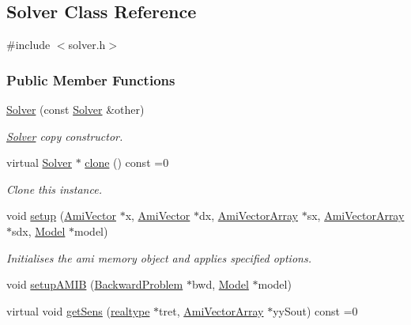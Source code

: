 \hypertarget{classamici_1_1_solver}{}\subsection{Solver Class Reference}
\label{classamici_1_1_solver}


{\ttfamily \#include $<$solver.\+h$>$}

\subsubsection*{Public Member Functions}
\begin{DoxyCompactItemize}
\item 
\mbox{\hyperlink{classamici_1_1_solver_a4676b699f5efede8bee51636bbe8b54a}{Solver}} (const \mbox{\hyperlink{classamici_1_1_solver}{Solver}} \&other)
\begin{DoxyCompactList}\small\item\em \mbox{\hyperlink{classamici_1_1_solver}{Solver}} copy constructor. \end{DoxyCompactList}\item 
virtual \mbox{\hyperlink{classamici_1_1_solver}{Solver}} $\ast$ \mbox{\hyperlink{classamici_1_1_solver_ad40c0e06f5ee35afc1dd60e9f80ac5be}{clone}} () const =0
\begin{DoxyCompactList}\small\item\em Clone this instance. \end{DoxyCompactList}\item 
void \mbox{\hyperlink{classamici_1_1_solver_a5cffde567803181ec12c71117c74b47a}{setup}} (\mbox{\hyperlink{classamici_1_1_ami_vector}{Ami\+Vector}} $\ast$x, \mbox{\hyperlink{classamici_1_1_ami_vector}{Ami\+Vector}} $\ast$dx, \mbox{\hyperlink{classamici_1_1_ami_vector_array}{Ami\+Vector\+Array}} $\ast$sx, \mbox{\hyperlink{classamici_1_1_ami_vector_array}{Ami\+Vector\+Array}} $\ast$sdx, \mbox{\hyperlink{classamici_1_1_model}{Model}} $\ast$model)
\begin{DoxyCompactList}\small\item\em Initialises the ami memory object and applies specified options. \end{DoxyCompactList}\item 
void \mbox{\hyperlink{classamici_1_1_solver_a04ef010145a9a17746128e55d4e0a436}{setup\+A\+M\+IB}} (\mbox{\hyperlink{classamici_1_1_backward_problem}{Backward\+Problem}} $\ast$bwd, \mbox{\hyperlink{classamici_1_1_model}{Model}} $\ast$model)
\item 
virtual void \mbox{\hyperlink{classamici_1_1_solver_a0db027ca9e9778c0b40afdb80f11a3af}{get\+Sens}} (\mbox{\hyperlink{namespaceamici_a1bdce28051d6a53868f7ccbf5f2c14a3}{realtype}} $\ast$tret, \mbox{\hyperlink{classamici_1_1_ami_vector_array}{Ami\+Vector\+Array}} $\ast$yy\+Sout) const =0

\end{DoxyCompactItemize}
